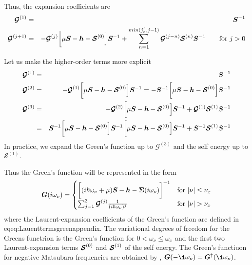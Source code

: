 \documentclass[11pt,a4paper]{report}
\begin{document}
Thus, the expansion coefficients are
\begin{eqnarray}
\bm{\mathcal{G}}^{(1)}&=&\bm{S}^{-1}
\nonumber\\
\bm{\mathcal{G}}^{(j+1)}
&=&-
\bm{\mathcal{G}}^{(j)}
\biggl[\mu\bm{S}-\bm{h}-\bm{\mathcal{S}}^{(0)}\Bigr]\bm{S}^{-1}
+\sum_{n=1}^{min(j_x',j-1)}\bm{\mathcal{G}}^{(j-n)}\bm{\mathcal{S}}^{(n)}\bm{S}^{-1}
\qquad\text{for $j>0$}
\end{eqnarray}


Let us make the higher-order terms more explicit
\begin{eqnarray}
\bm{\mathcal{G}}^{(1)}&=&\bm{S}^{-1}
\nonumber\\
\bm{\mathcal{G}}^{(2)}
&=&-
\bm{\mathcal{G}}^{(1)}
\biggl[\mu\bm{S}-\bm{h}-\bm{\mathcal{S}}^{(0)}\Bigr]\bm{S}^{-1}
=-
\bm{S}^{-1}\biggl[\mu\bm{S}-\bm{h}-\bm{\mathcal{S}}^{(0)}\Bigr]\bm{S}^{-1}
\nonumber\\
\bm{\mathcal{G}}^{(3)}
&=&-
\bm{\mathcal{G}}^{(2)}
\biggl[\mu\bm{S}-\bm{h}-\bm{\mathcal{S}}^{(0)}\Bigr]\bm{S}^{-1}
+\bm{\mathcal{G}}^{(1)}\bm{\mathcal{S}}^{(1)}\bm{S}^{-1}
\nonumber\\
&=&
\bm{S}^{-1}\biggl[\mu\bm{S}-\bm{h}-\bm{\mathcal{S}}^{(0)}\Bigr]\bm{S}^{-1}
\biggl[\mu\bm{S}-\bm{h}-\bm{\mathcal{S}}^{(0)}\Bigr]\bm{S}^{-1}
+
\bm{S}^{-1}\bm{\mathcal{S}}^{(1)}\bm{S}^{-1}
\label{eq:Lauenttermsgreenappendix}
\end{eqnarray}
In practice, we expand the Green's function up to $\mathcal{G}^{(3)}$
and the self energy up to $\mathcal{S}^{(1)}$.


Thus the Green's function will be represented in the form
\begin{eqnarray}
\mat{G}(i\omega_\nu)=
\begin{cases}
\biggl[(i\hbar\omega_\nu+\mu)\mat{S}
-\mat{h}-\mat{\Sigma}(i\omega_\nu)\biggr]^{-1}
&\text{for $|\nu|\le\nu_x$}\\
\sum_{j=1}^3\mat{\mathcal{G}}^{(j)}\frac{1}{(i\hbar\omega_\nu)^j}
&\text{for $|\nu|>\nu_x$}
\end{cases}
\end{eqnarray}
where the Laurent-expansion coefficients of the Green's function are
defined in eq{eq:Lauenttermsgreenappendix}. The variational degrees of
freedom for the Greens functrion is the Green's function for
$0<\omega_\nu\le\omega_x$ and the first two Laurent-expansion terms
$\bm{\mathcal{S}}^{(0)}$ and $\bm{\mathcal{S}}^{(1)}$ of the self
energy. The Green's functiuon for negative Matsubara frequencies are
obtained by ,
$\mat{G}(-\i\omega_\nu)=\mat{G}^\dagger(\i\omega_\nu)$.
\end{document}
